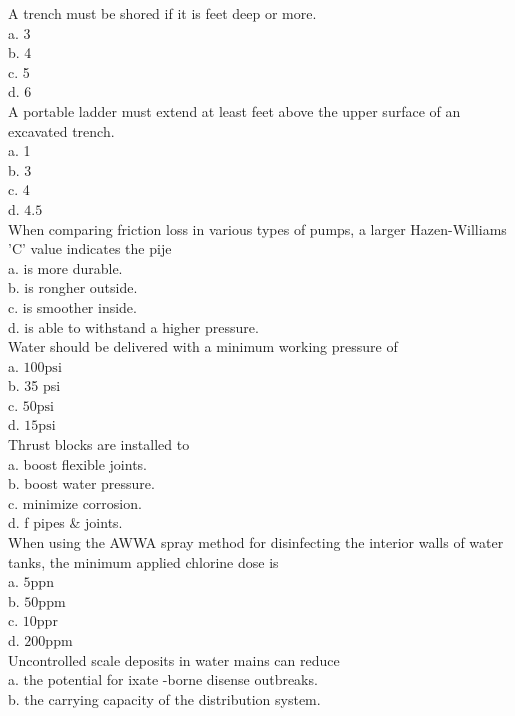 A trench must be shored if it is feet deep or more.\\
a. 3\\
b. 4\\
c. 5\\
d. 6\\

A portable ladder must extend at least feet above the upper surface of an excavated trench.\\
a. 1\\
b. 3\\
c. 4\\
d. $4.5$\\

When comparing friction loss in various types of pumps, a larger Hazen-Williams 'C' value indicates the pije\\
a. is more durable.\\
b. is rongher outside.\\
c. is smoother inside.\\
d. is able to withstand a higher pressure.\\

Water should be delivered with a minimum working pressure of\\
a. $100 \mathrm{psi}$\\
b. 35 psi\\
c. $50 \mathrm{psi}$\\
d. $15 \mathrm{psi}$\\

Thrust blocks are installed to\\
a. boost flexible joints.\\
b. boost water pressure.\\
c. minimize corrosion.\\
d.  f pipes \& joints.\\

When using the AWWA spray method for disinfecting the interior walls of water tanks, the minimum applied chlorine dose is\\
a. $5 \mathrm{ppn}$\\
b. $50 \mathrm{ppm}$\\
c. $10 \mathrm{ppr}$\\
d.  $200 \mathrm{ppm}$\\

Uncontrolled scale deposits in water mains can reduce\\
a. the potential for ixate -borne disense outbreaks.\\
b.  the carrying capacity of the distribution system.\\

